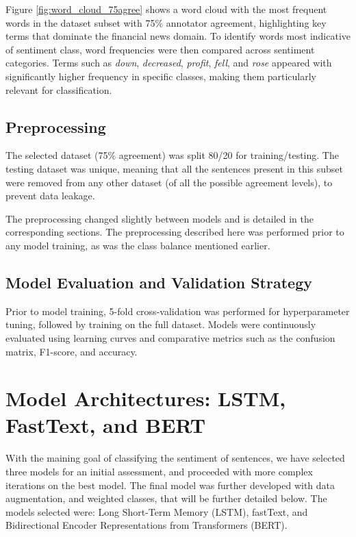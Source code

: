 \documentclass[conference]{IEEEtran}
\begin{document}
Figure \ref{fig:word_cloud_75agree} shows a word cloud with the most frequent words in the dataset subset with 75\% annotator agreement, highlighting key terms that dominate the financial news domain. To identify words most indicative of sentiment class, word frequencies were then compared across sentiment categories. Terms such as \textit{down}, \textit{decreased}, \textit{profit}, \textit{fell}, and \textit{rose} appeared with significantly higher frequency in specific classes, making them particularly relevant for classification.

\subsection{Preprocessing}

The selected dataset (75\% agreement) was split 80/20 for training/testing.
The testing dataset was unique, meaning that all the sentences present in this subset were removed from any other dataset (of all the possible agreement levels), to prevent data leakage.


The preprocessing changed slightly between models and is detailed in the corresponding sections. The preprocessing described here was performed prior to any model training, as was the class balance mentioned earlier.

\subsection{Model Evaluation and Validation Strategy}

Prior to model training, 5-fold cross-validation was performed for hyperparameter tuning, followed by training on the full dataset. Models were continuously evaluated using learning curves and comparative metrics such as the confusion matrix, F1-score, and accuracy.

\section{Model Architectures: LSTM, FastText, and BERT}

With the maining goal of classifying the sentiment of sentences, we have selected three models for an initial assessment, and proceeded with more complex iterations on the best model. The final model was further developed with data augmentation, and weighted classes, that will be further detailed below. The models selected were: Long Short-Term Memory (LSTM), fastText, and Bidirectional Encoder Representations from Transformers (BERT).
\end{document}
